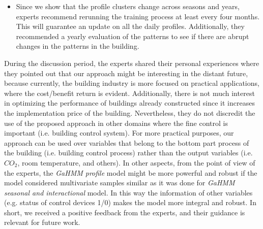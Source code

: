 \begin{itemize}
\item Since we show that the profile clusters change across seasons and years, experts recommend rerunning the training process at least every four months. This will guarantee an update on all the daily profiles. Additionally, they recommended a yearly evaluation of the patterns to see if there are abrupt changes in the patterns in the building. 

\end{itemize}
    


During the discussion period, the experts shared their personal experiences where they pointed out that our approach might be interesting in the distant future, because currently, the building industry is more focused on practical applications, where the cost/benefit return is evident. Additionally, there is not much interest in optimizing the performance of buildings already constructed since it increases the implementation price of the building. Nevertheless, they do not discredit the use of the proposed approach in other domains where the fine control is important (i.e. building control system). For more practical purposes, our approach can be used over variables that belong to the bottom part process of the building (i.e. building control process) rather than the output variables (i.e. $CO_2$, room temperature, and others). In other aspects, from the point of view of the experts, the \textit{GaHMM profile} model might be more powerful and robust if the model considered multivariate samples similar as it was done for \textit{GaHMM seasonal and interactional} model. In this way the information of other variables (e.g. status of control devices 1/0) makes the model more integral and robust. In short, we received a positive feedback from the experts, and their guidance is relevant for future work.   